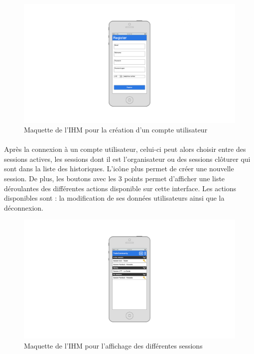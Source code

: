 \documentclass[titlepage, 12pt]{report}
\begin{document}
\begin{figure}[!h]
	\caption{Maquette de l'IHM pour la création d'un compte utilisateur}
	\label{create_user_account}
	\centering
	\includegraphics[scale=0.2]{images/mockups/register.png}
\end{figure}

\paragraph{}Après la connexion à un compte utilisateur, celui-ci peut alors choisir entre des sessions actives, les sessions dont il est l'organisateur ou des sessions clôturer qui sont dans la liste des historiques. L'icône plus permet de créer une nouvelle session. De plus, les boutons avec les 3 points permet d'afficher une liste déroulantes des différentes actions disponible sur cette interface. Les actions disponibles sont : la modification de ses données utilisateurs ainsi que la déconnexion.

\begin{figure}[!h]
	\caption{Maquette de l'IHM pour l'affichage des différentes sessions}
	\label{all_sessions}
	\centering
	\includegraphics[scale=0.2]{images/mockups/session_view.png}
\end{figure}
\end{document}
